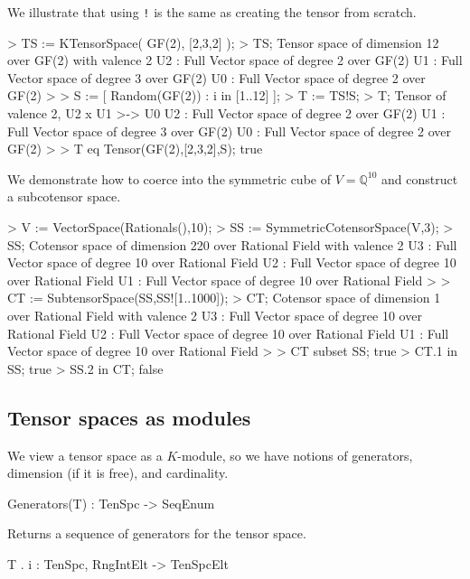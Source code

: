 \begin{example}[TenCoerce]
We illustrate that using {\tt !} is the same as creating the tensor from scratch.

\begin{code}
> TS := KTensorSpace( GF(2), [2,3,2] );
> TS;
Tensor space of dimension 12 over GF(2) with valence 2
U2 : Full Vector space of degree 2 over GF(2)
U1 : Full Vector space of degree 3 over GF(2)
U0 : Full Vector space of degree 2 over GF(2)
> 
> S := [ Random(GF(2)) : i in [1..12] ];
> T := TS!S;
> T;
Tensor of valence 2, U2 x U1 >-> U0
U2 : Full Vector space of degree 2 over GF(2)
U1 : Full Vector space of degree 3 over GF(2)
U0 : Full Vector space of degree 2 over GF(2)
> 
> T eq Tensor(GF(2),[2,3,2],S);
true
\end{code}

We demonstrate how to coerce into the symmetric cube of $V=\mathbb{Q}^{10}$ and construct a subcotensor space.

\begin{code}
> V := VectorSpace(Rationals(),10);
> SS := SymmetricCotensorSpace(V,3);
> SS;
Cotensor space of dimension 220 over Rational Field with valence 2
U3 : Full Vector space of degree 10 over Rational Field
U2 : Full Vector space of degree 10 over Rational Field
U1 : Full Vector space of degree 10 over Rational Field
> 
> CT := SubtensorSpace(SS,SS![1..1000]);
> CT;
Cotensor space of dimension 1 over Rational Field with valence 2
U3 : Full Vector space of degree 10 over Rational Field
U2 : Full Vector space of degree 10 over Rational Field
U1 : Full Vector space of degree 10 over Rational Field
> 
> CT subset SS;
true
> CT.1 in SS;
true
> SS.2 in CT;
false
\end{code}
\end{example}

\subsection{Tensor spaces as modules}

We view a tensor space as a $K$-module, so we have notions of generators, 
dimension (if it is free), and cardinality.

\begin{intrinsics}
Generators(T) : TenSpc -> SeqEnum
\end{intrinsics}

Returns a sequence of generators for the tensor space. 

\begin{intrinsics}
T . i : TenSpc, RngIntElt -> TenSpcElt
\end{intrinsics}

